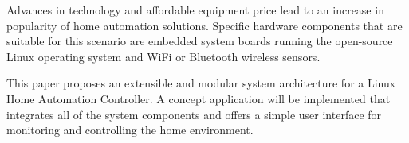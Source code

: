 
Advances in technology and affordable equipment price lead to an increase in popularity of home automation solutions. Specific hardware components that are suitable for this scenario are embedded system boards running the open-source Linux operating system and WiFi or Bluetooth wireless sensors.

This paper proposes an extensible and modular system architecture for a Linux Home Automation Controller. A concept application will be implemented that integrates all of the system components and offers a simple user interface for monitoring and controlling the home environment.
